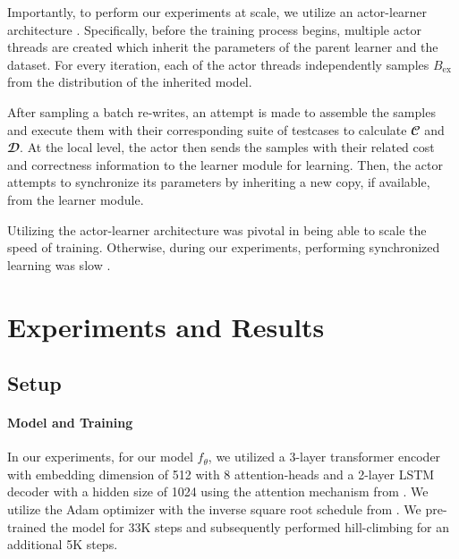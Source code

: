 \documentclass{article}
\begin{document}
Importantly, to perform our experiments at scale, we utilize an actor-learner architecture  \citep{liang2018memory, espeholt2018impala}. Specifically, before the training process begins, multiple actor threads are created which inherit the parameters of the parent learner and the dataset. For every iteration, each of the actor threads independently samples $B_{\textrm{ex}}$ from the distribution of the inherited model. 

After sampling a batch re-writes, an attempt is made to assemble the samples and execute them with their corresponding suite of testcases to calculate $\mathbfcal{C}$ and $\mathbfcal{D}$. At the local level, the actor then sends the samples with their related cost and correctness information to the learner module for learning. Then, the actor attempts to synchronize its parameters by inheriting a new copy, if available, from the learner module.

Utilizing the actor-learner architecture was pivotal in being able to scale the speed of training. Otherwise, during our experiments, performing synchronized learning was slow . 


\section{Experiments and Results}

\subsection{Setup}

\paragraph{Model and Training} In our experiments, for our model $f_{\theta}$, we utilized a 3-layer transformer encoder with embedding dimension of 512 with 8 attention-heads and a 2-layer LSTM decoder with a hidden size of 1024 using the attention mechanism from \citet{bahdanau2014neural}. We utilize the Adam optimizer \cite{kingma2014adam} with the inverse square root schedule from \citet{vaswani2017attention}. We pre-trained the model for 33K steps and subsequently performed hill-climbing for an additional 5K steps. 
\end{document}
